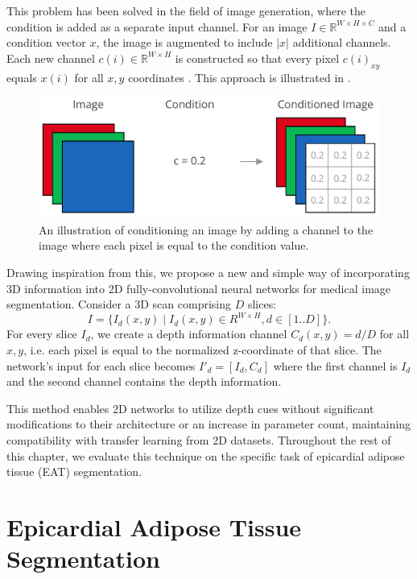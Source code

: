 This problem has been solved in the field of image generation, where the condition is added as a separate input channel. For an image \(I \in \mathbb{R}^{W \times H \times C}\) and a condition vector \(x\), the image is augmented to include \(\lvert x \rvert\) additional channels. Each new channel \(c(i) \in \mathbb{R}^{W \times H}\) is constructed so that every pixel \(c(i)_{xy}\) equals \(x(i)\) for all \(x, y\) coordinates \cite{mirzaConditionalGenerativeAdversarial2014}. This approach is illustrated in .

\begin{figure}[t!]
    \centering
    \includegraphics[width=0.65\columnwidth]{images/6/conditioned-image}
    \caption{An illustration of conditioning an image by adding a channel to the image where each pixel is equal to the condition value.}
    \label{fig:conditioned-image}
\end{figure}

Drawing inspiration from this, we propose a new and simple way of incorporating 3D information into 2D fully-convolutional neural networks for medical image segmentation. Consider a 3D scan comprising \(D\) slices:
\begin{equation}
	I = \{I_d(x, y)\; \vert\;  I_d(x,y) \in R^{W \times H}, d \in [1..D]\}.
\end{equation}
For every slice \(I_d\), we create a depth information channel \(C_d(x, y) = d / D\) for all \(x, y\), i.e. each pixel is equal to the normalized z-coordinate of that slice. The network's input for each slice becomes $I'_{d} = [I_d, C_d]$ where the first channel is $I_d$ and the second channel contains the depth information.

This method enables 2D networks to utilize depth cues without significant modifications to their architecture or an increase in parameter count, maintaining compatibility with transfer learning from 2D datasets. Throughout the rest of this chapter, we evaluate this technique on the specific task of epicardial adipose tissue (EAT) segmentation.

\section{Epicardial Adipose Tissue Segmentation}

